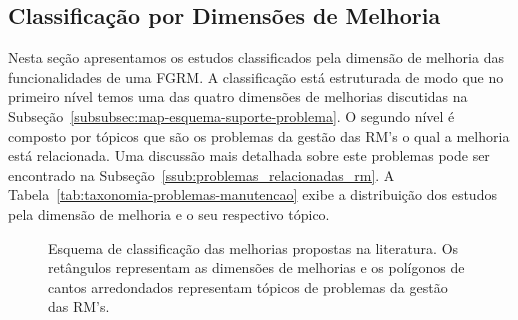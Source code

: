 \subsection{Classificação por Dimensões de Melhoria}
\label{sub:extensões_para_problemas_na_manutenção_de_software}

Nesta seção apresentamos os estudos classificados pela dimensão de melhoria das
funcionalidades de uma FGRM. A classificação está estruturada de modo que no
primeiro nível temos uma das quatro dimensões de melhorias discutidas na
Subseção~\ref{subsubsec:map-esquema-suporte-problema}. O segundo nível é
composto por tópicos que são os problemas da gestão das RM's o qual a melhoria
está relacionada. Uma discussão mais detalhada sobre este problemas pode ser
encontrado na Subseção~\ref{ssub:problemas_relacionadas_rm}. A
Tabela~\ref{tab:taxonomia-problemas-manutencao} exibe a distribuição dos estudos
pela dimensão de melhoria e o seu respectivo tópico.



\begin{figure}[tb] \centering
	\caption{Esquema de classificação das melhorias propostas na literatura. Os
		retângulos representam as dimensões de melhorias e os polígonos de
		cantos arredondados representam tópicos de problemas da gestão das
		RM's.}
	\label{fig:diagrama-esquema-dimensao-melhorias} \end{figure}

